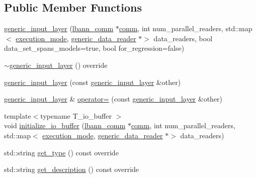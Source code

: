 \subsection*{Public Member Functions}
\begin{DoxyCompactItemize}
\item 
\hyperlink{classlbann_1_1generic__input__layer_a0c7ce1625cd2be2368822c2662346538}{generic\+\_\+input\+\_\+layer} (\hyperlink{classlbann_1_1lbann__comm}{lbann\+\_\+comm} $\ast$\hyperlink{file__io_8cpp_ab048c6f9fcbcfaa57ce68b00263dbebe}{comm}, int num\+\_\+parallel\+\_\+readers, std\+::map$<$ \hyperlink{base_8hpp_a2781a159088df64ed7d47cc91c4dc0a8}{execution\+\_\+mode}, \hyperlink{classlbann_1_1generic__data__reader}{generic\+\_\+data\+\_\+reader} $\ast$$>$ data\+\_\+readers, bool data\+\_\+set\+\_\+spans\+\_\+models=true, bool for\+\_\+regression=false)
\item 
\hyperlink{classlbann_1_1generic__input__layer_a09575a4120064a6882883b3a0ee11b7e}{$\sim$generic\+\_\+input\+\_\+layer} () override
\item 
\hyperlink{classlbann_1_1generic__input__layer_a5447106074487e60d69add9cab511319}{generic\+\_\+input\+\_\+layer} (const \hyperlink{classlbann_1_1generic__input__layer}{generic\+\_\+input\+\_\+layer} \&other)
\item 
\hyperlink{classlbann_1_1generic__input__layer}{generic\+\_\+input\+\_\+layer} \& \hyperlink{classlbann_1_1generic__input__layer_a76d36777d01144cafe7b33ab5ce739d2}{operator=} (const \hyperlink{classlbann_1_1generic__input__layer}{generic\+\_\+input\+\_\+layer} \&other)
\item 
{\footnotesize template$<$typename T\+\_\+io\+\_\+buffer $>$ }\\void \hyperlink{classlbann_1_1generic__input__layer_ab4fa07865c28a35d39ff736075085aba}{initialize\+\_\+io\+\_\+buffer} (\hyperlink{classlbann_1_1lbann__comm}{lbann\+\_\+comm} $\ast$\hyperlink{file__io_8cpp_ab048c6f9fcbcfaa57ce68b00263dbebe}{comm}, int num\+\_\+parallel\+\_\+readers, std\+::map$<$ \hyperlink{base_8hpp_a2781a159088df64ed7d47cc91c4dc0a8}{execution\+\_\+mode}, \hyperlink{classlbann_1_1generic__data__reader}{generic\+\_\+data\+\_\+reader} $\ast$$>$ data\+\_\+readers)
\item 
std\+::string \hyperlink{classlbann_1_1generic__input__layer_a5392ea11b5eb98a8040bf5b5deed836a}{get\+\_\+type} () const override
\item 
std\+::string \hyperlink{classlbann_1_1generic__input__layer_a8ffe91a3d5b6f37d2dc17e657898dcc8}{get\+\_\+description} () const override

\end{DoxyCompactItemize}
